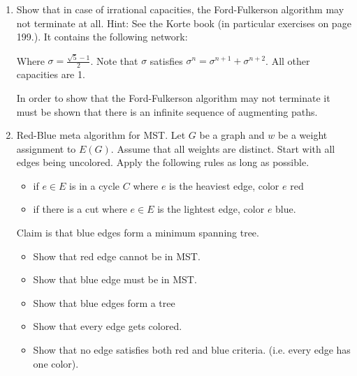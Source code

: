 \documentclass[11pt, oneside]{article}
\begin{document}
\begin{enumerate}
  \item %
    Show that in case of irrational capacities, the Ford-Fulkerson algorithm may
    not terminate at all.
    Hint: See the Korte book (in particular exercises on page 199.).
    It contains the following network:
    \begin{center}
    \end{center}
    Where $\sigma = \frac{\sqrt{5}-1}{2}$. Note that $\sigma$ satisfies
    $\sigma^n = \sigma^{n+1} + \sigma^{n+2}$. All other capacities are 1.

    In order to show that the Ford-Fulkerson algorithm may not terminate it must
    be shown that there is an infinite sequence of augmenting paths.

  \item %
    Red-Blue meta algorithm for MST.
    Let $G$ be a graph and $w$ be a weight assignment to $E(G)$.
    Assume that all weights are distinct.
    Start with all edges being uncolored.
    Apply the following rules as long as possible.
    \begin{itemize}
      \item if $e \in E$ is in a cycle $C$ where $e$ is the heaviest edge, color $e$ red
      \item if there is a cut where $e\in E$ is the lightest edge, color $e$ blue.
    \end{itemize}
    Claim is that blue edges form a minimum spanning tree.
    \begin{itemize}
      \item Show that red edge cannot be in MST.
      \item Show that blue edge must be in MST.
      \item Show that blue edges form a tree
      \item Show that every edge gets colored.
      \item Show that no edge satisfies both red and blue criteria. (i.e. every edge has one color).
    \end{itemize}


\end{enumerate}
\end{document}
